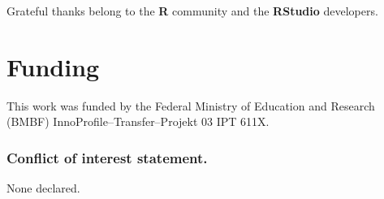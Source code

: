 \documentclass[a4,center,fleqn]{NAR}
\begin{document}
Grateful thanks belong to the \textbf{R} community and the \textbf{RStudio} 
developers.

\section{Funding}
This work was funded by the Federal Ministry of Education and Research (BMBF) 
InnoProfile--Transfer--Projekt 03 IPT 611X.

\subsubsection{Conflict of interest statement.} None declared.



\end{document}
